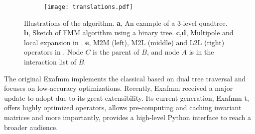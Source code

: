 \begin{figure*}
    \begin{subfigure}{\columnwidth}
        \centering
        \subcaption{}
        \label{fig:near_far_decomp}
    \end{subfigure}
    \begin{subfigure}{\columnwidth}
        \centering
        \subcaption{}
        \label{fig:fmm_sketch}
    \end{subfigure}
    \begin{subfigure}{\columnwidth}
        \centering
        \subcaption{}
        \label{fig:multipole}
    \end{subfigure}
    \begin{subfigure}{\columnwidth}
        \centering
        \subcaption{}
        \label{fig:local}
    \end{subfigure}
    \begin{subfigure}{\linewidth}
        \centering
        \subcaption{}
        \texttt{[image: translations.pdf]}
        \label{fig:translations}
    \end{subfigure}
    \caption{Illustrations of the \fmm algorithm.
    \textbf{a}, An example of a 3-level quadtree.
    \textbf{b}, Sketch of FMM algorithm using a binary tree.
    \textbf{c},\textbf{d}, Multipole and local expansion in \kifmm.
    \textbf{e}, M2M (left), M2L (middle) and L2L (right) operators in \kifmm. Node $C$ is the parent of $B$, and node $A$ is in the interaction list of $B$.
    }
\end{figure*}

The original Exafmm \cite{yokota2012tuned,yokota2013fmm} implements the classical \fmm based on dual tree traversal and focuses on low-accuracy optimizations.
Recently, Exafmm received a major update to adopt \kifmm due to its great extensibility.
Its current generation, Exafmm-t, offers highly optimized \kifmm operators, allows pre-computing and caching invariant matrices and more importantly, provides a high-level Python interface to reach a broader audience.
